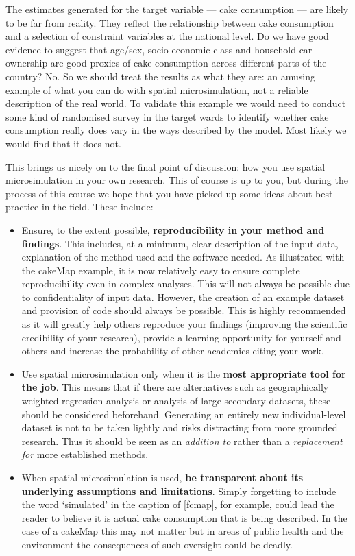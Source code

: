 \documentclass[a4paper, 11pt, twoside]{article}
\begin{document}
The estimates generated for the target variable --- cake consumption --- are likely to be
far from reality. They reflect the relationship between cake consumption and
a selection of constraint variables at the national level. Do we have good evidence to suggest
that age/sex, socio-economic class and household car ownership are good proxies of cake consumption
across different parts of the country? No. So we should treat the results as what they are:
an amusing example of what you can do with spatial microsimulation, not a reliable description
of the real world. To validate this example we would need to conduct some kind of randomised
survey in the target wards to identify whether cake consumption really does vary in the ways
described by the model. Most likely we would find that it does not.

This brings us nicely on to the final point of discussion: how you use spatial microsimulation in
your own research. This of course is up to you, but during the process of this course we hope that
you have picked up some ideas about best practice in the field. These include:
\begin{itemize}
 \item Ensure, to the extent possible, \textbf{reproducibility in your method and findings}. This includes, at a minimum,
clear description of the input data, explanation of the method used and the software needed. As illustrated
with the cakeMap example, it is now relatively easy to ensure complete reproducibility even in complex analyses.
This will not always be possible due to confidentiality of input data. However, the creation of an example dataset
and provision of code should always be possible. This is highly recommended as it will greatly help others reproduce
your findings (improving the scientific credibility of your research), provide a learning opportunity for yourself and
others and increase the probability of other academics citing your work.
 \item Use spatial microsimulation only when it is the \textbf{most appropriate tool for the job}. 
This means that if there are alternatives such as geographically weighted regression analysis
or analysis of large secondary datasets, these should be considered beforehand. Generating an entirely
new individual-level dataset is not to be taken lightly and risks distracting from more grounded research.
Thus it should be seen as an \emph{addition to} rather than a \emph{replacement for} more established methods.
\item When spatial microsimulation is used, \textbf{be transparent about its underlying assumptions and limitations}.
Simply forgetting to include the word `simulated' in the caption of \cref{fcmap}, for example, could lead
the reader to believe it is actual cake consumption that is being described. In the case
of a cakeMap this may not matter but in areas of public health and the environment the consequences
of such oversight could be deadly.
\end{itemize}
\end{document}
